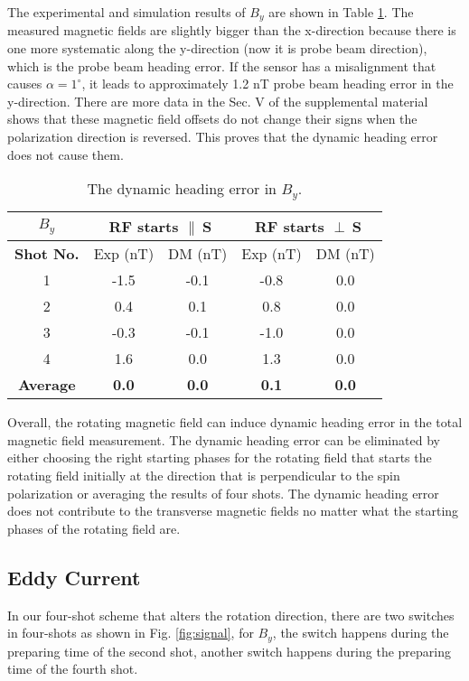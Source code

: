 \documentclass[prx,twocolumn,10pt,nofootinbib]{revtex4-1}
\begin{document}
The experimental and simulation results of $B_y$ are shown in Table \ref{table:by_HE}. The measured magnetic fields are slightly bigger than the x-direction because there is one more systematic along the y-direction (now it is probe beam direction), which is the probe beam heading error. If the sensor has a misalignment that causes $\alpha = 1^{\circ}$, it leads to approximately 1.2 nT probe beam heading error in the y-direction. There are more data in the Sec. V of the supplemental material shows that these magnetic field offsets do not change their signs when the polarization direction is reversed. This proves that the dynamic heading error does not cause them.

\begin{table}
\centering
\begin{tabular}{|c|c|c|c|c|}
\hline
$B_y$ & \multicolumn{2}{c|}{RF starts $\parallel~\bm{S}$} & \multicolumn{2}{c|}{RF starts $\perp~\bm{S}$} \\ \hline
\textbf{Shot No.} & Exp (nT) & DM (nT) & Exp (nT) & DM (nT) \\ \hline
1 & -1.5 & -0.1 & -0.8 & 0.0 \\ \hline
2 & 0.4 & 0.1 & 0.8 & 0.0 \\ \hline
3 & -0.3 & -0.1 & -1.0 & 0.0 \\ \hline
4 & 1.6 & 0.0 & 1.3 & 0.0 \\ \hline
\textbf{Average} & \textbf{0.0} & \textbf{0.0} & \textbf{0.1} & \textbf{0.0} \\ \hline
\end{tabular}
\caption{The dynamic heading error in $B_y$.}
\label{table:by_HE}
\end{table}

Overall, the rotating magnetic field can induce dynamic heading error in the total magnetic field measurement. The dynamic heading error can be eliminated by either choosing the right starting phases for the rotating field that starts the rotating field initially at the direction that is perpendicular to the spin polarization or averaging the results of four shots. The dynamic heading error does not contribute to the transverse magnetic fields no matter what the starting phases of the rotating field are.

\subsection{Eddy Current}\label{sec:exp_eddy_current}

In our four-shot scheme that alters the rotation direction, there are two switches in four-shots as shown in Fig. \ref{fig:signal}, for $B_y$, the switch happens during the preparing time of the second shot, another switch happens during the preparing time of the fourth shot.
\end{document}
